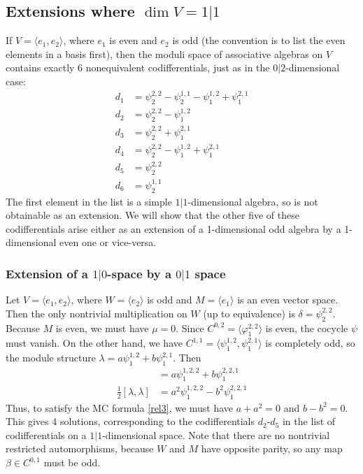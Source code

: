 \documentclass[12pt]{amsart}
\theoremstyle{definition}
\begin{document}
\subsection{Extensions where $\dim V=1|1$}
If $V=\langle e_1,e_2\rangle$, where $e_1$ is even and $e_2$ is odd
(the convention is to list the even elements in a basis first), then
the moduli space of associative algebras on $V$ contains exactly 6
nonequivalent codifferentials, just as in the $0|2$-dimensional case:
\begin{align*}
d_1&={\psi^{{2,2}}_{2}}-{\psi^{{1,1}}_{2}}-{\psi^{{1,2}}_{1}}+{\psi^{{2,1}}_{1}}\\
d_2&={\psi^{{2,2}}_{2}}-{\psi^{{1,2}}_{1}}\\
d_3&={\psi^{{2,2}}_{2}}+{\psi^{{2,1}}_{1}}\\
d_4&={\psi^{{2,2}}_{2}}-{\psi^{{1,2}}_{1}}+{\psi^{{2,1}}_{1}}\\
d_5&={\psi^{{2,2}}_{2}}\\
d_6&={\psi^{{1,1}}_{2}}
\end{align*}
The first element in the list is a simple $1|1$-dimensional algebra, so is not
obtainable as an extension.
We will show that the other five of these codifferentials
arise either as an extension of a 1-dimensional
odd algebra by a 1-dimensional even one or vice-versa.
\subsubsection{Extension of a $1|0$-space by a $0|1$ space}
Let $V=\langle e_1,e_2\rangle$, where $W=\langle e_2\rangle$ is odd and
$M=\langle e_1\rangle$ is an even
vector space.  Then the only nontrivial multiplication on $W$ (up to equivalence) is
$\delta={\psi^{{2,2}}_{2}}$.  Because $M$ is even, we must have $\mu=0$.
Since $C^{0,2}=\langle {{\varphi}^{{2,2}}_{1}}\rangle$
is even, the cocycle $\psi$ must vanish.  On the other hand, we have
$C^{1,1}=\langle {\psi^{{1,2}}_{1}},{\psi^{{2,1}}_{1}}\rangle$ is completely odd, so the module structure
$\lambda=a{\psi^{{1,2}}_{1}}+b{\psi^{{2,1}}_{1}}$.
Then
\begin{align*}
[\delta,\lambda]&=a{\psi^{{1,2,2}}_{1}}+b{\psi^{{2,2,1}}_{1}}\\
\tfrac12[\lambda,\lambda]&=a^2{\psi^{{1,2,2}}_{1}}-b^2{\psi^{{2,2,1}}_{1}}
\end{align*}
Thus, to satisfy the MC formula \eqref{rel3}, we must have $a+a^2=0$ and $b-b^2=0$.
This gives 4 solutions,
corresponding to the codifferentials $d_2$-$d_5$ in the
list of codifferentials on a $1|1$-dimensional
space.  Note that there are no nontrivial restricted automorphisms,
because $W$ and $M$ have opposite
parity, so any map $\beta\in C^{0,1}$ must be odd.
\end{document}
